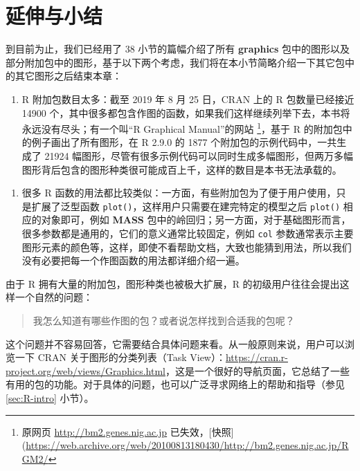 \documentclass[
  b5paper,
  UTF8,twoside]{book}
\providecommand{\tightlist}{%
  \setlength{\itemsep}{0pt}\setlength{\parskip}{0pt}}
\begin{document}
\section{延伸与小结}\label{sec:base-graph-ext}

到目前为止，我们已经用了 38 小节的篇幅介绍了所有 \textbf{graphics} 包中的图形以及部分附加包中的图形，基于以下两个考虑，我们将在本小节简略介绍一下其它包中的其它图形之后结束本章：

\begin{enumerate}
\def\labelenumi{\arabic{enumi}.}
\tightlist
\item
  R 附加包数目太多：截至 2019 年 8 月 25 日，CRAN 上的 R 包数量已经接近 14900 个，其中很多都包含作图的函数，如果我们这样继续列举下去，本书将永远没有尽头；有一个叫``R Graphical Manual''的网站 \footnote{原网页 \url{http://bm2.genes.nig.ac.jp} 已失效，{[}快照{]}(\url{https://web.archive.org/web/20100813180430/http://bm2.genes.nig.ac.jp/RGM2/}}，基于 R 的附加包中的例子画出了所有图形，在 R 2.9.0 的 1877 个附加包的示例代码中，一共生成了 21924 幅图形，尽管有很多示例代码可以同时生成多幅图形，但两万多幅图形背后包含的图形种类很可能成百上千，这样的数目是本书无法承载的。
\end{enumerate}

\begin{enumerate}
\def\labelenumi{\arabic{enumi}.}
\setcounter{enumi}{1}
\tightlist
\item
  很多 R 函数的用法都比较类似：一方面，有些附加包为了便于用户使用，只是扩展了泛型函数 \texttt{plot()}，这样用户只需要在建完特定的模型之后 \texttt{plot()} 相应的对象即可，例如 \textbf{MASS} 包中的岭回归；另一方面，对于基础图形而言，很多参数都是通用的，它们的意义通常比较固定，例如 \texttt{col} 参数通常表示主要图形元素的颜色等，这样，即使不看帮助文档，大致也能猜到用法，所以我们没有必要把每一个作图函数的用法都详细介绍一遍。
\end{enumerate}

由于 R 拥有大量的附加包，图形种类也被极大扩展，R 的初级用户往往会提出这样一个自然的问题：

\begin{quote}
我怎么知道有哪些作图的包？或者说怎样找到合适我的包呢？
\end{quote}

这个问题并不容易回答，它需要结合具体问题来看。从一般原则来说，用户可以浏览一下 CRAN 关于图形的分类列表（Task
View）：\url{https://cran.r-project.org/web/views/Graphics.html}，这是一个很好的导航页面，它总结了一些有用的包的功能。对于具体的问题，也可以广泛寻求网络上的帮助和指导（参见 \ref{sec:R-intro} 小节）。
\end{document}
